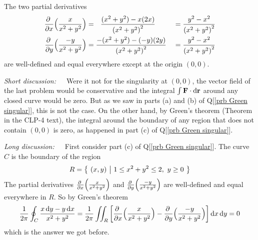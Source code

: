 \begin{solution} 
The two partial derivatives
\begin{alignat*}{3}
\pdiff{}{x}\Big( \frac{x}{x^2+y^2}\Big)
&=\ \ \frac{(x^2+y^2)-x(2x)}{{(x^2+y^2)}^2}
&&=\frac{y^2-x^2}{{(x^2+y^2)}^2}\\
\pdiff{}{y}\Big( \frac{-y}{x^2+y^2}\Big)
&=\frac{-(x^2+y^2)-(-y)(2y)}{{(x^2+y^2)}^2}
&&=\frac{y^2-x^2}{{(x^2+y^2)}^2}\\
\end{alignat*}
are well-defined and equal everywhere except at the origin $(0,0)$.

\emph{Short discussion:}\ \ \ 
Were it not for the singularity at $(0,0)$, the vector field of the last
problem would be conservative and the integral $\int\mathbf{F}\cdot \mathrm{d}\mathbf{r}$
around any closed curve would be zero. But as we saw in parts (a) and (b) of
Q[\ref{prb Green singular}], this is not the case. On the other hand, 
by Green's theorem  (Theorem \eref{CLP317}{thm:Green} in the CLP-4 text), 
the integral around the boundary of any region that
does not contain $(0,0)$ is zero, as happened in part (c) of 
Q[\ref{prb Green singular}]. 

\emph{Long discussion:}\ \ \ First consider part (c) of
Q[\ref{prb Green singular}]. The curve $C$ is the boundary of 
the region
\begin{equation*}
R = \big\{ \ (x,y)\ \big|\ 1\le x^2+y^2\le 2,\ y\ge 0\ \big\}
\end{equation*}
The partial derivatives 
$\pdiff{}{x}\Big( \frac{x}{x^2+y^2}\Big)$
and
$\pdiff{}{y}\Big( \frac{-y}{x^2+y^2}\Big)$
are well-defined and equal everywhere in $R$. So by Green's
theorem
\begin{equation*}
\frac{1}{2\pi}\oint_C \frac{x\,\dee{y}-y\,\dee{x}}{x^2+y^2}
=\frac{1}{2\pi}\dblInt_R\left[
   \pdiff{}{x}\Big( \frac{x}{x^2+y^2}\Big)
 -\pdiff{}{y}\Big( \frac{-y}{x^2+y^2}\Big)\right]\dee{x}\, \dee{y} 
=0
\end{equation*}
which is the answer we got before. 


\end{solution}
